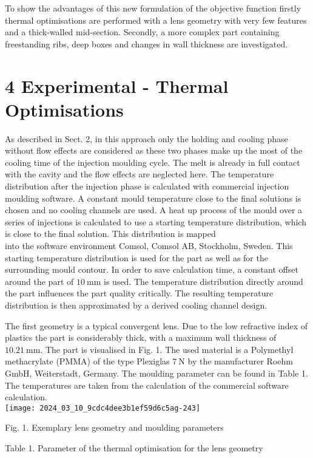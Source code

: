 \documentclass[10pt]{article}
\begin{document}
To show the advantages of this new formulation of the objective function firstly thermal optimisations are performed with a lens geometry with very few features and a thick-walled mid-section. Secondly, a more complex part containing freestanding ribs, deep boxes and changes in wall thickness are investigated.

\section*{4 Experimental - Thermal Optimisations}
As described in Sect. 2, in this approach only the holding and cooling phase without flow effects are considered as these two phases make up the most of the cooling time of the injection moulding cycle. The melt is already in full contact with the cavity and the flow effects are neglected here. The temperature distribution after the injection phase is calculated with commercial injection moulding software. A constant mould temperature close to the final solutions is chosen and no cooling channels are used. A heat up process of the mould over a series of injections is calculated to use a starting temperature distribution, which is close to the final solution. This distribution is mapped\\
into the software environment Comsol, Comsol AB, Stockholm, Sweden. This starting temperature distribution is used for the part as well as for the surrounding mould contour. In order to save calculation time, a constant offset around the part of $10 \mathrm{~mm}$ is used. The temperature distribution directly around the part influences the part quality critically. The resulting temperature distribution is then approximated by a derived cooling channel design.

The first geometry is a typical convergent lens. Due to the low refractive index of plastics the part is considerably thick, with a maximum wall thickness of $10.21 \mathrm{~mm}$. The part is visualised in Fig. 1. The used material is a Polymethyl methacrylate (PMMA) of the type Plexiglas $7 \mathrm{~N}$ by the manufacturer Roehm GmbH, Weiterstadt, Germany. The moulding parameter can be found in Table 1. The temperatures are taken from the calculation of the commercial software calculation.\\
\texttt{[image: 2024\_03\_10\_9cdc4dee3b1ef59d6c5ag-243]}

Fig. 1. Exemplary lens geometry and moulding parameters

Table 1. Parameter of the thermal optimisation for the lens geometry
\end{document}
